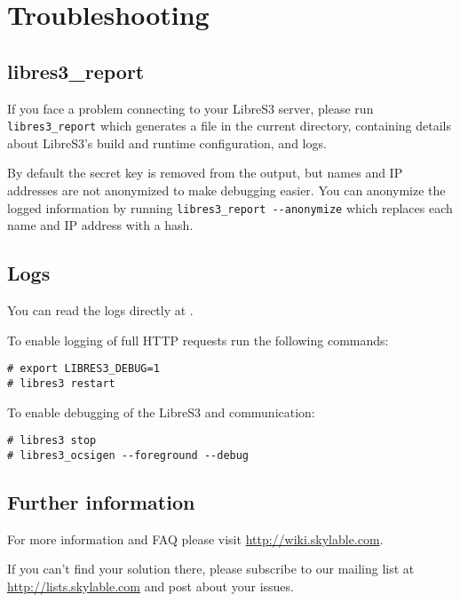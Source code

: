 \chapter{Troubleshooting}
\section{libres3\_report}

If you face a problem connecting to your LibreS3 server, please run
\verb|libres3_report| which generates a file  in the
current directory, containing details about LibreS3's build and runtime
configuration, and logs.

By default the secret key is removed from the output, but names and IP addresses
are not anonymized to make debugging easier.
You can anonymize the logged information by running
 \verb|libres3_report --anonymize| which replaces each name and IP address with
 a hash.

\section{Logs}

You can read the logs directly at .

To enable logging of full HTTP requests run the following commands:

\begin{lstlisting}
# export LIBRES3_DEBUG=1
# libres3 restart
\end{lstlisting}

To enable debugging of the LibreS3 and \SX communication:
\begin{lstlisting}
# libres3 stop
# libres3_ocsigen --foreground --debug
\end{lstlisting}

\section{Further information}

For more information and FAQ please visit \url{http://wiki.skylable.com}.

If you can't find your solution there, please subscribe to our mailing list
at \url{http://lists.skylable.com} and post about your issues.

